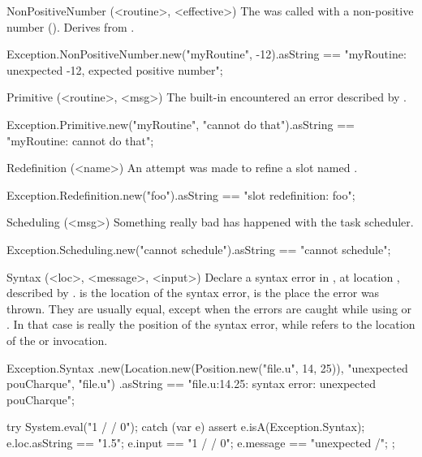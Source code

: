 \begin{urbiscriptapi}
\item[NonPositiveNumber](<routine>, <effective>)
  The  was called with a non-positive number
  ().  Derives from .
\begin{urbiassert}
Exception.NonPositiveNumber.new("myRoutine", -12).asString
== "myRoutine: unexpected -12, expected positive number";
\end{urbiassert}


\item[Primitive](<routine>, <msg>)
  The built-in  encountered an error described by
  .
\begin{urbiassert}
Exception.Primitive.new("myRoutine", "cannot do that").asString
  == "myRoutine: cannot do that";
\end{urbiassert}


\item[Redefinition](<name>)
  An attempt was made to refine a slot named .
\begin{urbiassert}
Exception.Redefinition.new("foo").asString
  == "slot redefinition: foo";
\end{urbiassert}


\item[Scheduling](<msg>)
  Something really bad has happened with the \urbi task scheduler.
\begin{urbiassert}
Exception.Scheduling.new("cannot schedule").asString
  == "cannot schedule";
\end{urbiassert}


\item[Syntax](<loc>, <message>, <input>)%
  Declare a syntax error in , at location , described by
  .   is the location of the syntax error,
   is the place the error was thrown.  They are usually equal,
  except when the errors are caught while using  or
  .  In that case  is really the position of
  the syntax error, while  refers to the location of the
   or  invocation.
\begin{urbiassert}
Exception.Syntax
  .new(Location.new(Position.new("file.u", 14, 25)),
       "unexpected pouCharque", "file.u")
  .asString
== "file.u:14.25: syntax error: unexpected pouCharque";
\end{urbiassert}

\begin{urbiscript}
try
{
  System.eval("1 / / 0");
}
catch (var e)
{
  assert
  {
    e.isA(Exception.Syntax);
    e.loc.asString == "1.5";
    e.input == "1 / / 0";
    e.message == "unexpected /";
  }
};
\end{urbiscript}



\end{urbiscriptapi}
